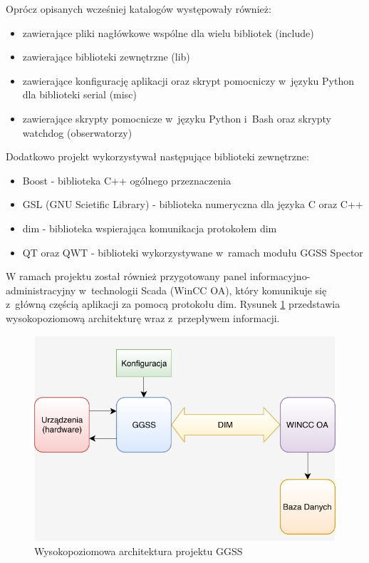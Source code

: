 \par Oprócz opisanych wcześniej katalogów występowały również:
\begin{itemize}
\item zawierające pliki nagłówkowe wspólne dla wielu bibliotek (include)
\item zawierające biblioteki zewnętrzne (lib)
\item zawierające konfigurację aplikacji oraz skrypt pomocniczy w~języku Python dla biblioteki serial (misc)
\item zawierające skrypty pomocnicze w~języku Python i~Bash oraz skrypty watchdog (obserwatorzy)
\end{itemize}

\par Dodatkowo projekt wykorzystywał następujące biblioteki zewnętrzne:
\begin{itemize}
\item Boost - biblioteka C++ ogólnego przeznaczenia
\item GSL (GNU Scietific Library) - biblioteka numeryczna dla języka C oraz C++
\item dim - biblioteka wspierająca komunikacja protokołem dim
\item QT oraz QWT - biblioteki wykorzystywane w~ramach modułu GGSS Spector
\end{itemize}
W ramach projektu został również przygotowany panel informacyjno-administracyjny w~technologii Scada (WinCC OA), który komunikuje się z~główną częścią aplikacji za pomocą protokołu dim. Rysunek \ref{fig:highLevelArch} przedstawia wysokopoziomową architekturę wraz z~przepływem informacji.

\begin{figure}[H]
\centering
\caption{Wysokopoziomowa architektura projektu GGSS}
\label{fig:highLevelArch}
\includegraphics[width=\textwidth]{res/highLevelArch}
\end{figure}

